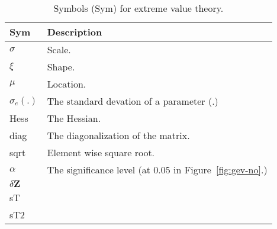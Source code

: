 \begin{table}[h!]
    \centering
    \begin{tabular}{ll}
    \hline \hline
    \textbf{Sym} & \textbf{Description} \\
    \hline
        $\sigma$ & Scale. \\
        $\xi$ & Shape. \\
        $\mu$ & Location. \\
        $\sigma_e(.)$ & The standard devation of a parameter (.)\\
        Hess & The Hessian.\\
        diag & The diagonalization of the matrix. \\
        sqrt & Element wise square root.\\
        $\alpha$ & The significance level (at 0.05 in Figure~\ref{fig:gev-no}.)\\
        $\delta \mathbf{Z}$&  \\
        sT & \\
        sT2 & \\
    \hline \hline
    \end{tabular}
    \caption{Symbols (Sym) for extreme value theory.}
    \label{tab:fluid_variables}
\end{table}
